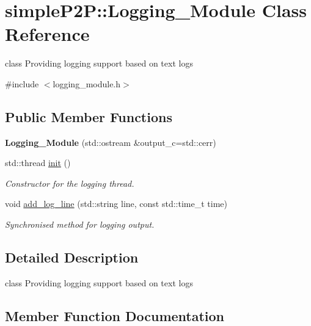\hypertarget{classsimpleP2P_1_1Logging__Module}{}\section{simple\+P2P\+:\+:Logging\+\_\+\+Module Class Reference}
\label{classsimpleP2P_1_1Logging__Module}


class Providing logging support based on text logs  




{\ttfamily \#include $<$logging\+\_\+module.\+h$>$}

\subsection*{Public Member Functions}
\begin{DoxyCompactItemize}
\item 
\mbox{\label{classsimpleP2P_1_1Logging__Module_a300ea6b6f0c06caa7891c2226fecf67b}} 
{\bfseries Logging\+\_\+\+Module} (std\+::ostream \&output\+\_\+c=std\+::cerr)
\item 
std\+::thread \hyperlink{classsimpleP2P_1_1Logging__Module_a57e92e151320fd7c811689d831498b6a}{init} ()
\begin{DoxyCompactList}\small\item\em Constructor for the logging thread. \end{DoxyCompactList}\item 
void \hyperlink{classsimpleP2P_1_1Logging__Module_a5f1eb6d6c66d406f02ae4093cc7657ec}{add\+\_\+log\+\_\+line} (std\+::string line, const std\+::time\+\_\+t time)
\begin{DoxyCompactList}\small\item\em Synchronised method for logging output. \end{DoxyCompactList}\end{DoxyCompactItemize}


\subsection{Detailed Description}
class Providing logging support based on text logs 

\subsection{Member Function Documentation}
\mbox{\label{classsimpleP2P_1_1Logging__Module_a5f1eb6d6c66d406f02ae4093cc7657ec}} 

